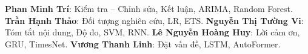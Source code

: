 \textbf{Phan Minh Trí}: Kiểm tra – Chỉnh sửa, Kết luận, ARIMA, Random Forest.
\textbf{Trần Hạnh Thảo}: Đối tượng nghiên cứu, LR, ETS.
\textbf{Nguyễn Thị Tường Vi}: Tóm tắt nội dung, Độ đo, SVM, RNN.
\textbf{Lê Nguyễn Hoàng Huy}: Lời cảm ơn, GRU, TimesNet.
\textbf{Vương Thanh Linh}: Đặt vấn đề, LSTM, AutoFormer.
